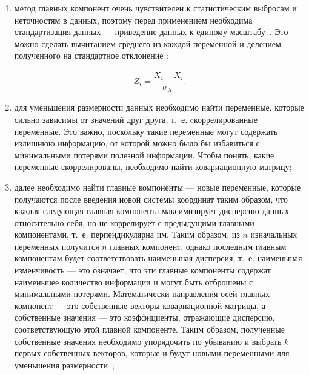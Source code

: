 \begin{enumerate}[label=\arabic*.]
	\item метод главных компонент очень чувствителен к статистическим выбросам и неточностям в данных, поэтому перед применением необходима стандартизация данных --- приведение данных к единому масштабу~\cite{polyak, zakaria}. Это можно сделать вычитанием среднего из каждой переменной и делением полученного на стандартное отклонение \cite{zakaria}:
	
	\begin{equation}\label{eq:normalization_Z1}
		Z_i = \frac{{X_i - \bar{X_i}}}{{\sigma_{X_i}}}.
	\end{equation}
	\item для уменьшения размерности данных необходимо найти переменные, которые сильно зависимы от значений друг друга, т.~е. cкоррелированные переменные. Это важно, поскольку такие переменные могут содержать излишнюю информацию, от которой можно было бы избавиться с минимальными потерями полезной информации. Чтобы понять, какие переменные скоррелированы, необходимо найти ковариационную матрицу;
	\item далее необходимо найти главные компоненты --- новые переменные, которые получаются после введения новой системы координат таким образом, что каждая следующая главная компонента максимизирует дисперсию данных относительно себя, но не коррелирует с предыдущими главными компонентами, т.~е. перпендикулярна им. Таким образом, из $n$ изначальных переменных получится $n$ главных компонент, однако последним главным компонентам будет соответствовать наименьшая дисперсия, т.~е. наименьшая изменчивость --- это означает, что эти главные компоненты содержат наименьшее количество информации и могут быть отброшены с минимальными потерями. Математически направления осей главных компонент --- это собственные векторы ковариационной матрицы, а собственные значения --- это коэффициенты, отражающие дисперсию, соответствующую этой главной компоненте. Таким образом, полученные собственные значения необходимо упорядочить по убыванию и выбрать $k$ первых собственных векторов, которые и будут новыми переменными для уменьшения размерности~\cite{orlov, polyak, zakaria};
	

\end{enumerate}
